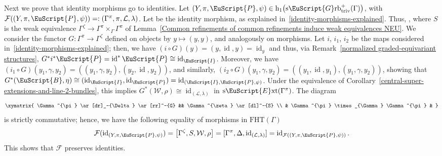 \documentclass[pdftex]{sigma}
\numberwithin{equation}{section}
\def\mathscr#1{\EuScript{#1}}
\def\hc#1{\mathrm{h}_{#1}}
\newcommand{\id}{\operatorname{id}}
\newcommand{\Grbtriv}{\mathscr{G}\mathrm{rb}_{\mathrm{triv}}}
\newcommand{\sGrbtriv}{\mathrm{s}\Grbtriv}
\def\sExt{\normalfont\text{s}\mathscr{E}\text{xt}}
\begin{document}
 Next we prove that identity morphisms go to identities.
 Let $(Y,\pi,\mathscr{P},\psi)\in \hc 1\bigl(\sGrbtriv^{+}(\Gamma)\bigr)$, with $\mathcal{F}((Y,\pi,\mathscr{P},\psi))=:(\Gamma^\pi,\pi,\mathcal{L},\lambda)$. Let \smash{$\id_{(Y,\pi,\mathscr{P},\psi)}= (Z,\zeta,\mathscr{B},\eta)$} be the identity morphism, as explained in~\ref{identity-morphisms-explained}.
Thus, \smash{$\mathcal{F}(\id_{(Y,\pi,\mathscr{P},\psi)})=\big[\Gamma^{\zeta},S,\mathcal{W},\rho\big]$}, where $S$ is the weak equivalence $\Gamma^{\zeta} \to \Gamma^\pi \times_{\Gamma} \Gamma^{\pi}$ of Lemma~\ref{Common refinements of common refinements induce weak equivalences NEU}. We consider the functor $G\colon \Gamma^{\pi} \to \Gamma^{\zeta}$ defined on objects by $y \mapsto (y,y)$, and analogously on morphisms. Let $i$, $i_1$, $i_2$ be the maps
considered in~\ref{identity-morphisms-explained}; then, we have $(i \circ G)(y)=(y,\id,y)=\id_y$ and thus, via Remark~\ref{normalized graded-equivariant structures}, $G^{*}i^{*}\mathscr{P}=\id^{*}\mathscr{P}\cong \id_{\mathscr{I}}$. Moreover, we have $(i_1 \circ G)(y_1,\gamma,y_2) =((y_1,\gamma,y_2),(y_2,\id,y_2))$, and similarly, $(i_2 \circ G)(y_1,\gamma,y_2) =((y_1,\id,y_1),(y_1,\gamma,y_2))$, showing that
$
G^{*}(\mathscr{B},\eta)\cong (\id_{\mathscr{I}},\id_{\mathscr{P}})=\id_{(\mathscr{I},\mathscr{P},\psi)}$.
Under the equivalence of Corollary~\ref{central-super-extensions-and-line-2-bundles}, this implies $G^{*}(\mathcal{W},\rho) \cong \id_{(\mathcal{L},\lambda)}$ in $\sExt(\Gamma^{\pi})$. The diagram
 \begin{equation*}
 \xymatrix{
 \Gamma^{\pi} \ar[dr]_-{\Delta} \ar[rr]^-{G} && \Gamma^{\zeta} \ar[dl]^-{S} \\
 & \Gamma^{\pi} \times_{\Gamma} \Gamma^{\pi} &
 }
 \end{equation*}
is strictly commutative; hence, we have the following equality of morphisms in $\mathrm{FHT}(\Gamma)$
\begin{equation*}
\mathcal{F}(\id_{(Y,\pi,\mathscr{P},\psi)})=\big[\Gamma^{\zeta},S,\mathcal{W},\rho\big]=[\Gamma^{\pi},\Delta,\id_{(\mathcal{L},\lambda)}]=\id_{\mathcal{F}((Y,\pi,\mathscr{P},\psi))}.
\end{equation*}
This shows that $\mathcal{F}$ preserves identities.
\end{document}

